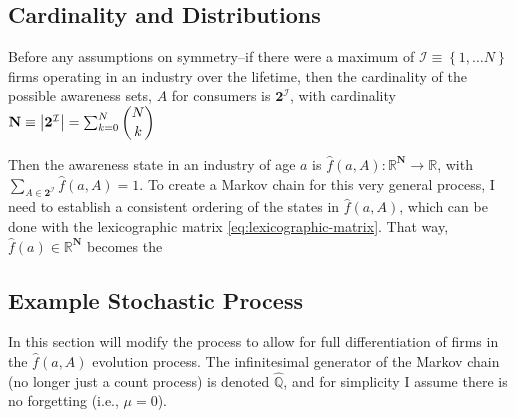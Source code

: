 \documentclass[12pt]{article}
\newcommand{\set}[1]{\ensuremath{\left\{{#1}\right\}}}
\newcommand{\R}{\ensuremath{\mathbb{R}}}
\newcommand{\Q}[0]{\ensuremath{\mathbb{Q}}}
\newcommand{\abs}[1]{\ensuremath{\left| {#1}\right|}}
\begin{document}
\subsection{Cardinality and Distributions}
Before any assumptions on symmetry--if there were a maximum of $\mathcal{I} \equiv \set{1,\ldots N}$ firms operating in an industry over the lifetime, then the cardinality of the possible awareness sets, $A$ for consumers is $\mathbf{2}^{\mathcal{I}}$, with cardinality $\mathbf{N} \equiv \abs{\mathbf{2}^{\mathcal{I}}} = \sum_{k=0}^{N} \dbinom{N}{k}$

Then the awareness state in an industry of age $a$ is $\hat{f}(a, A) : \R^{\mathbf{N}} \to \R$, with $\sum\limits_{A \in \mathbf{2}^{\mathcal{I}}}\hat{f}(a, A) = 1$.  To create a Markov chain for this very general process, I need to establish a consistent ordering of the states in $\hat{f}(a, A)$, which can be done with the lexicographic matrix \cref{eq:lexicographic-matrix}.  That way, $\hat{f}(a) \in \R^{\mathbf{N}}$ becomes the 

\subsection{Example Stochastic Process}\label{sec:fully-differentiated-example}

In this section will modify the process to allow for full differentiation of firms in the $\hat{f}(a,A)$ evolution process.  The infinitesimal generator of the Markov chain (no longer just a count process) is denoted $\hat{\Q}$, and for simplicity I assume there is no forgetting (i.e., $\mu = 0$).
\end{document}

